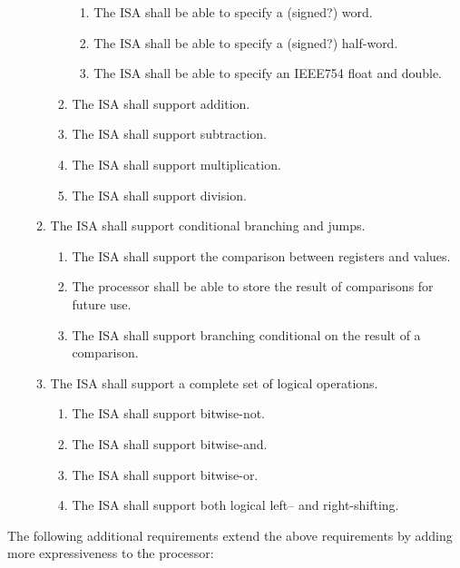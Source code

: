 \documentclass{article}
\begin{document}
\begin{enumerate}[label=R\arabic*]
\begin{enumerate}[label=\theenumi.\arabic*]
\begin{enumerate}[label=\theenumii.\arabic*]
\begin{enumerate}[label=\theenumiii.\arabic*]
                \item The ISA shall be able to specify a (signed?) word.
                \item The ISA shall be able to specify a (signed?) half-word.
                \item The ISA shall be able to specify an IEEE754 float and double.
            \end{enumerate}
            \item The ISA shall support addition.
            \item The ISA shall support subtraction.
            \item The ISA shall support multiplication.
            \item The ISA shall support division.
        \end{enumerate}
        \item The ISA shall support conditional branching and jumps.
        \begin{enumerate}[label=\theenumii.\arabic*]
            \item The ISA shall support the comparison between registers and values.
            \item The processor shall be able to store the result of comparisons for future use.
            \item The ISA shall support branching conditional on the result of a comparison.
        \end{enumerate}
        \item The ISA shall support a complete set of logical operations.
        \begin{enumerate}[label=\theenumii.\arabic*]
            \item The ISA shall support bitwise-not.
            \item The ISA shall support bitwise-and.
            \item The ISA shall support bitwise-or.
            \item The ISA shall support both logical left-- and right-shifting.
        \end{enumerate}
    \end{enumerate}
\end{enumerate}
\medskip

The following additional requirements extend the above requirements by adding more expressiveness to the processor:
\end{document}
